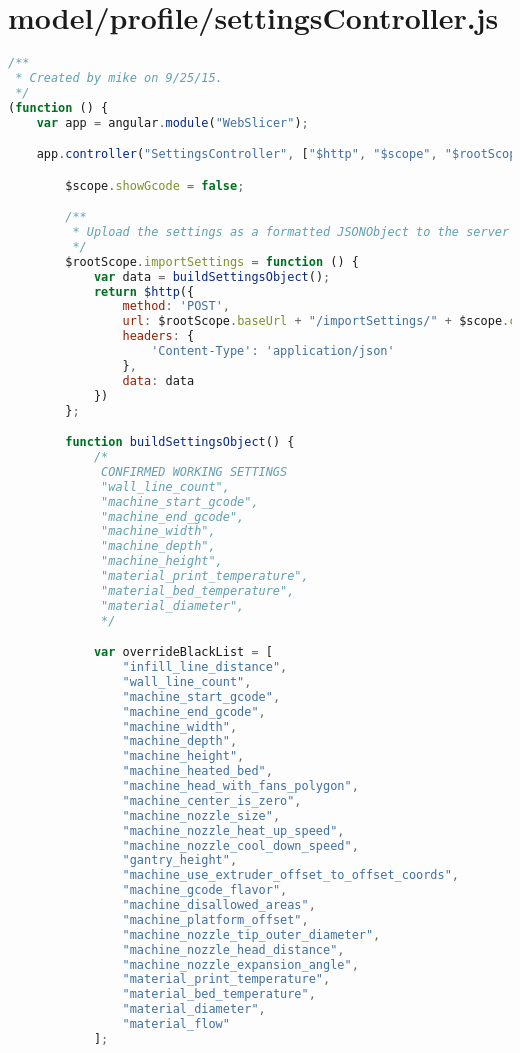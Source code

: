 
\section{model/profile/settingsController.js}
\begin{lstlisting}[language=JavaScript, label={lst:settingsController}, caption=This code is the main controller which brings in the static settings files and converts them into settings items.]
/**
 * Created by mike on 9/25/15.
 */
(function () {
    var app = angular.module("WebSlicer");

    app.controller("SettingsController", ["$http", "$scope", "$rootScope", function ($http, $scope, $rootScope) {

        $scope.showGcode = false;

        /**
         * Upload the settings as a formatted JSONObject to the server for slicing
         */
        $rootScope.importSettings = function () {
            var data = buildSettingsObject();
            return $http({
                method: 'POST',
                url: $rootScope.baseUrl + "/importSettings/" + $scope.clientId,
                headers: {
                    'Content-Type': 'application/json'
                },
                data: data
            })
        };

        function buildSettingsObject() {
            /*
             CONFIRMED WORKING SETTINGS
             "wall_line_count",
             "machine_start_gcode",
             "machine_end_gcode",
             "machine_width",
             "machine_depth",
             "machine_height",
             "material_print_temperature",
             "material_bed_temperature",
             "material_diameter",
             */

            var overrideBlackList = [
                "infill_line_distance",
                "wall_line_count",
                "machine_start_gcode",
                "machine_end_gcode",
                "machine_width",
                "machine_depth",
                "machine_height",
                "machine_heated_bed",
                "machine_head_with_fans_polygon",
                "machine_center_is_zero",
                "machine_nozzle_size",
                "machine_nozzle_heat_up_speed",
                "machine_nozzle_cool_down_speed",
                "gantry_height",
                "machine_use_extruder_offset_to_offset_coords",
                "machine_gcode_flavor",
                "machine_disallowed_areas",
                "machine_platform_offset",
                "machine_nozzle_tip_outer_diameter",
                "machine_nozzle_head_distance",
                "machine_nozzle_expansion_angle",
                "material_print_temperature",
                "material_bed_temperature",
                "material_diameter",
                "material_flow"
            ];


\end{lstlisting}
